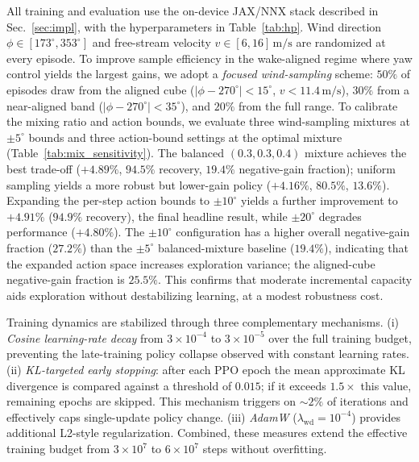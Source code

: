 \documentclass[final,5p,times]{elsarticle}
\begin{document}
All training and evaluation use the on-device JAX/NNX stack described in Sec.~\ref{sec:impl}, with the hyperparameters in Table~\ref{tab:hp}. Wind direction $\phi\!\in[173^\circ,353^\circ]$ and free-stream velocity $v\!\in[6,16]\,\mathrm{m/s}$ are randomized at every episode. To improve sample efficiency in the wake-aligned regime where yaw control yields the largest gains, we adopt a \emph{focused wind-sampling} scheme: $50\%$ of episodes draw from the aligned cube ($|\phi-270^\circ|<15^\circ$, $v<11.4\,\mathrm{m/s}$), $30\%$ from a near-aligned band ($|\phi-270^\circ|<35^\circ$), and $20\%$ from the full range. To calibrate the mixing ratio and action bounds, we evaluate three wind-sampling mixtures at $\pm5^\circ$ bounds and three action-bound settings at the optimal mixture (Table~\ref{tab:mix_sensitivity}). The balanced $(0.3,0.3,0.4)$ mixture achieves the best trade-off ($+4.89\%$, $94.5\%$ recovery, $19.4\%$ negative-gain fraction); uniform sampling yields a more robust but lower-gain policy ($+4.16\%$, $80.5\%$, $13.6\%$). Expanding the per-step action bounds to $\pm10^\circ$ yields a further improvement to $\mathbf{+4.91\%}$ ($\mathbf{94.9\%}$ recovery), the final headline result, while $\pm20^\circ$ degrades performance ($+4.80\%$). The $\pm10^\circ$ configuration has a higher overall negative-gain fraction ($27.2\%$) than the $\pm5^\circ$ balanced-mixture baseline ($19.4\%$), indicating that the expanded action space increases exploration variance; the aligned-cube negative-gain fraction is $25.5\%$. This confirms that moderate incremental capacity aids exploration without destabilizing learning, at a modest robustness cost.

Training dynamics are stabilized through three complementary mechanisms. (i) \emph{Cosine learning-rate decay} from $3{\times}10^{-4}$ to $3{\times}10^{-5}$ over the full training budget, preventing the late-training policy collapse observed with constant learning rates. (ii) \emph{KL-targeted early stopping}: after each PPO epoch the mean approximate KL divergence is compared against a threshold of $0.015$; if it exceeds $1.5{\times}$ this value, remaining epochs are skipped. This mechanism triggers on ${\sim}2\%$ of iterations and effectively caps single-update policy change. (iii) \emph{AdamW} ($\lambda_\mathrm{wd}{=}10^{-4}$) provides additional L2-style regularization. Combined, these measures extend the effective training budget from $3{\times}10^{7}$ to $6{\times}10^{7}$ steps without overfitting.
\end{document}
